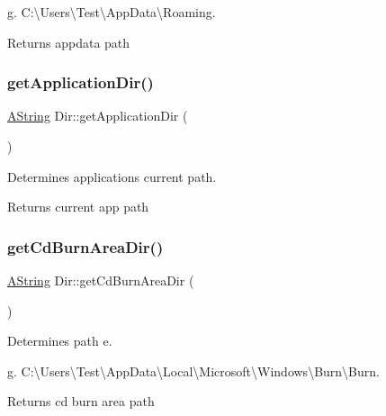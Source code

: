 g. C\+:\textbackslash{}\+Users\textbackslash{}\+Test\textbackslash{}\+App\+Data\textbackslash{}\+Roaming. \begin{DoxyReturn}{Returns}
appdata path 
\end{DoxyReturn}
\mbox{\label{class_dir_a05e273896fb4e82bc5b45372aa4e64c1}} 
\subsubsection{\texorpdfstring{getApplicationDir()}{getApplicationDir()}}
{\footnotesize\ttfamily \mbox{\hyperlink{class_a_string}{A\+String}} Dir\+::get\+Application\+Dir (\begin{DoxyParamCaption}{ }\end{DoxyParamCaption})\hspace{0.3cm}{\ttfamily [static]}}



Determines application\textquotesingle{}s current path. 

\begin{DoxyReturn}{Returns}
current app path 
\end{DoxyReturn}
\mbox{\label{class_dir_a5cf0fb165e56c039c4197851fee0e370}} 
\subsubsection{\texorpdfstring{getCdBurnAreaDir()}{getCdBurnAreaDir()}}
{\footnotesize\ttfamily \mbox{\hyperlink{class_a_string}{A\+String}} Dir\+::get\+Cd\+Burn\+Area\+Dir (\begin{DoxyParamCaption}{ }\end{DoxyParamCaption})\hspace{0.3cm}{\ttfamily [static]}}



Determines path e. 

g. C\+:\textbackslash{}\+Users\textbackslash{}\+Test\textbackslash{}\+App\+Data\textbackslash{}\+Local\textbackslash{}\+Microsoft\textbackslash{}\+Windows\textbackslash{}\+Burn\textbackslash{}\+Burn. \begin{DoxyReturn}{Returns}
cd burn area path 
\end{DoxyReturn}
\mbox{\label{class_dir_abfcb8baffd5c395ddaabc62a2a444de6}} 
